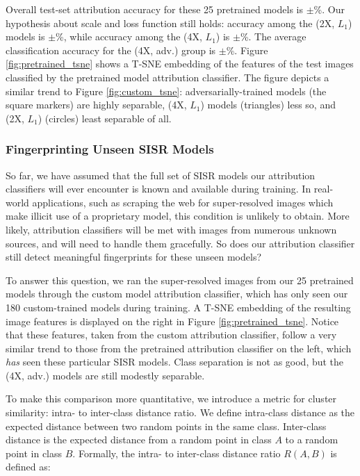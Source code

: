 \documentclass[10pt]{article} %
\begin{document}
Overall test-set attribution accuracy for these 25 pretrained models is \valPretrainedClassifierAccMean$\pm$\valPretrainedClassifierAccStd\%. Our hypothesis about scale and loss function still holds: accuracy among the (2X, $L_1$) models is \valPreTrainedTwoXModelClassifierAccMean$\pm$\valPreTrainedTwoXModelClassifierAccStd\%, while accuracy among the (4X, $L_1$) is \valPreTrainedFourXLOneModelClassifierAccMean$\pm$\valPreTrainedFourXLOneModelClassifierAccStd\%. The average classification accuracy for the (4X, adv.) group is \valPreTrainedGANModelClassifierAccMean$\pm$\valPreTrainedGANModelClassifierAccStd\%. Figure \ref{fig:pretrained_tsne} shows a T-SNE embedding of the features of the test images classified by the pretrained model attribution classifier. The figure depicts a similar trend to Figure \ref{fig:custom_tsne}: adversarially-trained models (the square markers) are highly separable, (4X, $L_1$) models (triangles) less so, and (2X, $L_1$) (circles) least separable of all.

\subsubsection{Fingerprinting Unseen SISR Models}

So far, we have assumed that the full set of SISR models our attribution classifiers will ever encounter is known and available during training. In real-world applications, such as scraping the web for super-resolved images which make illicit use of a proprietary model, this condition is unlikely to obtain. More likely, attribution classifiers will be met with images from numerous unknown sources, and will need to handle them gracefully. So does our attribution classifier still detect meaningful fingerprints for these unseen models?

To answer this question, we ran the super-resolved images from our 25 pretrained models through the custom model attribution classifier, which has only seen our 180 custom-trained models during training. A T-SNE embedding of the resulting image features is displayed on the right in Figure \ref{fig:pretrained_tsne}. Notice that these features, taken from the custom attribution classifier, follow a very similar trend to those from the pretrained attribution classifier on the left, which \textit{has} seen these particular SISR models. Class separation is not as good, but the (4X, adv.) models are still modestly separable.

To make this comparison more quantitative, we introduce a metric for cluster similarity: intra- to inter-class distance ratio. We define intra-class distance as the expected distance between two random points in the same class. Inter-class distance is the expected distance from a random point in class $A$ to a random point in class $B$. Formally, the intra- to inter-class distance ratio $R(A,B)$ is defined as:
\end{document}
